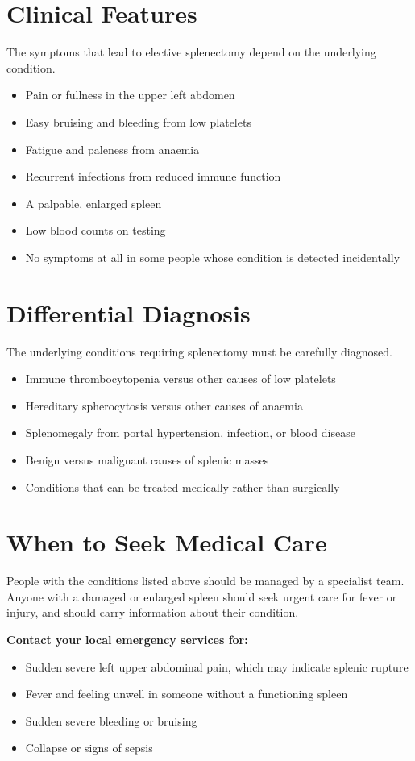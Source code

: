 \section*{Clinical Features}
The symptoms that lead to elective splenectomy depend on the underlying condition.
\begin{itemize}
    \item Pain or fullness in the upper left abdomen
    \item Easy bruising and bleeding from low platelets
    \item Fatigue and paleness from anaemia
    \item Recurrent infections from reduced immune function
    \item A palpable, enlarged spleen
    \item Low blood counts on testing
    \item No symptoms at all in some people whose condition is detected incidentally
\end{itemize}

\section*{Differential Diagnosis}
The underlying conditions requiring splenectomy must be carefully diagnosed.
\begin{itemize}
    \item Immune thrombocytopenia versus other causes of low platelets
    \item Hereditary spherocytosis versus other causes of anaemia
    \item Splenomegaly from portal hypertension, infection, or blood disease
    \item Benign versus malignant causes of splenic masses
    \item Conditions that can be treated medically rather than surgically
\end{itemize}

\section*{When to Seek Medical Care}
People with the conditions listed above should be managed by a specialist team. Anyone with a damaged or enlarged spleen should seek urgent care for fever or injury, and should carry information about their condition.

\textbf{Contact your local emergency services for:}
\begin{itemize}
    \item Sudden severe left upper abdominal pain, which may indicate splenic rupture
    \item Fever and feeling unwell in someone without a functioning spleen
    \item Sudden severe bleeding or bruising
    \item Collapse or signs of sepsis
\end{itemize}

